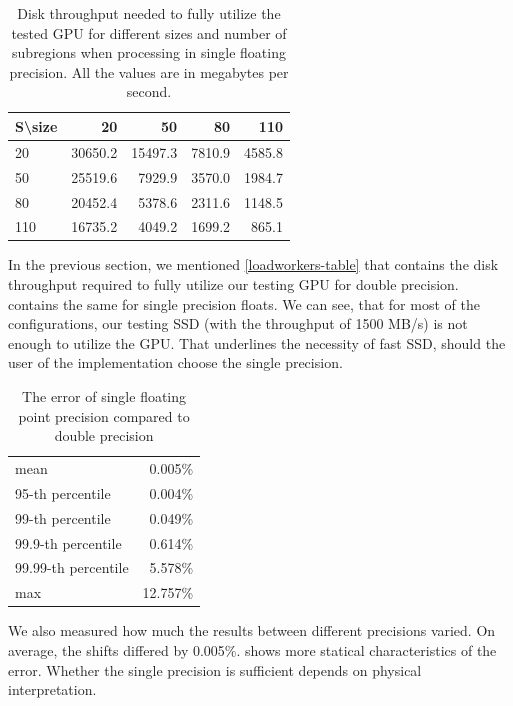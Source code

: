\begin{table}[]
	\centering
	\begin{tabular}{@{}l|rrrr@{}}
		S\textbackslash size &      20 &      50 &     80 &    110  \\ \midrule
		20                   & 30650.2 & 15497.3 & 7810.9 & 4585.8  \\
		50                   & 25519.6 &  7929.9 & 3570.0 & 1984.7  \\
		80                   & 20452.4 &  5378.6 & 2311.6 & 1148.5  \\
		110                  & 16735.2 &  4049.2 & 1699.2 &  865.1 
	\end{tabular}
	\caption{Disk throughput needed to fully utilize the tested GPU for different sizes and number of subregions when processing in single floating precision. All the values are in megabytes per second.}
	\label{necessary-disk-throughput-float}
\end{table}

In the previous section, we mentioned \cref{loadworkers-table} that contains the disk throughput required to fully utilize our testing GPU for double precision.   contains the same for single precision floats. We can see, that for most of the configurations, our testing SSD (with the throughput of 1500 MB/s) is not enough to utilize the GPU. That underlines the necessity of fast SSD, should the user of the implementation choose the single precision.



\begin{table}[]
	\centering
	\begin{tabular}{@{}l|r@{}}
		mean               & 0.005\% \\
		95-th percentile   & 0.004\% \\
		99-th percentile   & 0.049\% \\
		99.9-th percentile & 0.614\% \\
		99.99-th percentile & 5.578\% \\
		max                &  12.757\%
	\end{tabular}
	\caption{The error of single floating point precision compared to double precision}
	\label{float-error}
\end{table}

We also measured how much the results between different precisions varied. On average, the shifts differed by 0.005\%.  shows more statical characteristics of the error. Whether the single precision is sufficient depends on physical interpretation.



